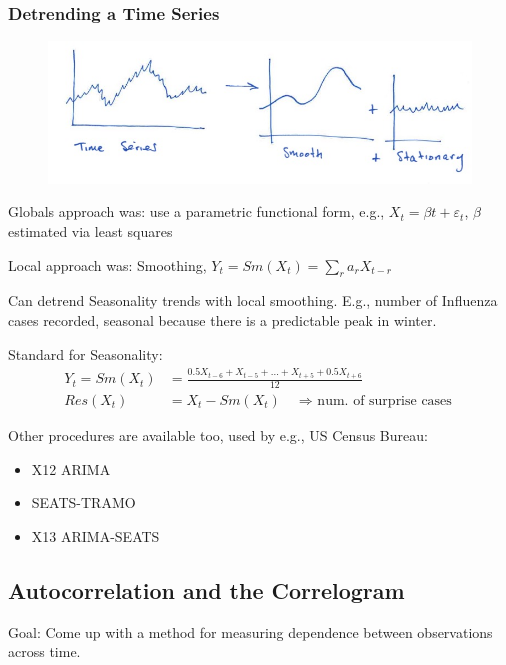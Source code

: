\subsubsection{Detrending a Time Series}

\begin{figure}[h]
\includegraphics[scale=0.4]{images/Screenshot 2024-03-30 at 15.07.16.jpg}
\centering
\end{figure}

Globals approach was: use a parametric functional form, e.g., $X_t=\beta t+\varepsilon_t$, $\beta$ estimated via least squares

Local approach was: Smoothing, $Y_t=Sm(X_t)=\sum_r a_r X_{t-r}$

Can detrend Seasonality trends with local smoothing. E.g., number of Influenza cases recorded, seasonal because there is a predictable peak in winter.

Standard for Seasonality:
\begin{align*}
    Y_t=Sm(X_t)&=\frac{0.5 X_{t-6} + X_{t-5}+...+X_{t+5} + 0.5 X_{t+6}}{12}\\
    Res(X_t)&=X_t-Sm(X_t) \quad \text{$\Rightarrow$ num. of surprise cases}
\end{align*}

Other procedures are available too, used by e.g., US Census Bureau:
\begin{itemize}
    \item X12 ARIMA
    \item SEATS-TRAMO
    \item X13 ARIMA-SEATS
\end{itemize}

\subsection{Autocorrelation and the Correlogram}

Goal: Come up with a method for measuring dependence between observations across time.

